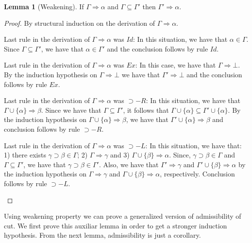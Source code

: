 \documentclass[12pt]{article}
\theoremstyle{definition}
\newtheorem{Lemma}{Lemma}
\begin{document}
\begin{Lemma}[Weakening]\label{lemma:weak}
  If $\Gamma \Rightarrow \alpha$ and $\Gamma \subseteq \Gamma'$ then $\Gamma'
  \Rightarrow \alpha$.
\end{Lemma}
\begin{proof}
  By structural induction on the derivation of $\Gamma \Rightarrow \alpha$.
  \begin{Cases}
    \item Last rule in the derivation of $\Gamma \Rightarrow \alpha$ was $Id$: In this
    situation, we have that $\alpha \in \Gamma$. Since $\Gamma \subseteq
    \Gamma'$, we have that $\alpha \in \Gamma'$ and the conclusion follows by
    rule $Id$.
    \item Last rule in the derivation of $\Gamma \Rightarrow \alpha$ was $Ex$: In this 
    case, we have that $\Gamma \Rightarrow \bot$. By the induction hypothesis on 
    $\Gamma \Rightarrow \bot$ we have that $\Gamma' \Rightarrow \bot$ and the 
    conclusion follows by rule $Ex$.
    \item Last rule in the derivation of $\Gamma \Rightarrow \alpha$ was $\supset-R$:
    In this situation, we have that $\Gamma \cup \{\alpha\} \Rightarrow \beta$.
    Since we have that $\Gamma \subseteq \Gamma'$, it follows that
    $\Gamma \cup \{\alpha\} \subseteq \Gamma' \cup \{\alpha\}$. By the induction
    hypothesis on $\Gamma \cup \{\alpha\} \Rightarrow \beta$, we have that
    $\Gamma' \cup \{\alpha\} \Rightarrow \beta$ and conclusion follows by rule
    $\supset-R$.
    \item Last rule in the derivation of $\Gamma \Rightarrow \alpha$ was $\supset-L$:
    In this situation, we have that: 1) there exists $\gamma \supset \beta \in
    \Gamma$; 2) $\Gamma \Rightarrow \gamma$ and 3) 
    $\Gamma \cup \{\beta\} \Rightarrow \alpha$. Since, $\gamma \supset
    \beta \in \Gamma$ and $\Gamma \subseteq \Gamma'$, we have that
    $\gamma\supset \beta \in \Gamma'$. Also, we have that
    $\Gamma' \Rightarrow \gamma$ and $\Gamma' \cup \{\beta\}\Rightarrow \alpha$
    by the induction hypothesis on $\Gamma\Rightarrow \gamma$ and
    $\Gamma \cup \{\beta\} \Rightarrow \alpha$, respectively. Conclusion follows
    by rule $\supset-L$.
  \end{Cases}
\end{proof}

Using weakening property we can prove a generalized version of admissibility of
cut. We first prove this auxiliar lemma in order to get a stronger induction
hypothesis. From the next lemma, admissibility is just a corollary.
\end{document}
